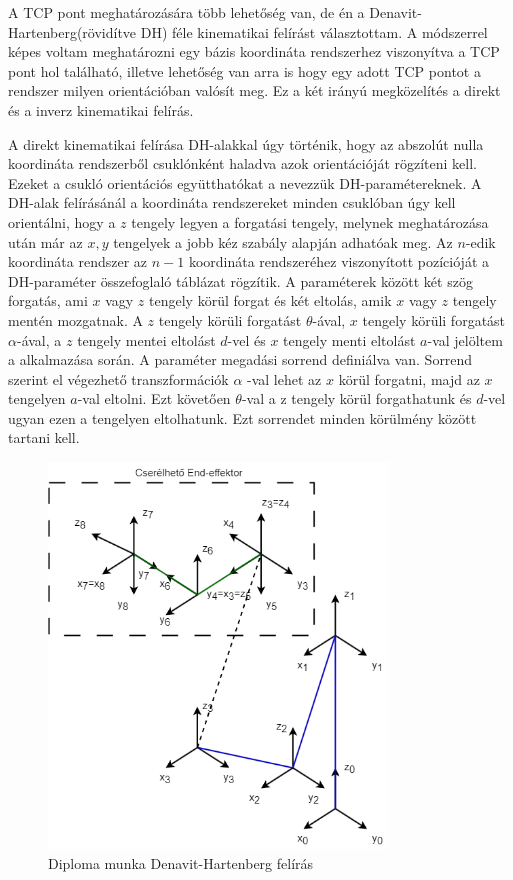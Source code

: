 A TCP pont meghatározására több lehetőség van, de én a Denavit-Hartenberg(rövidítve DH) féle kinematikai felírást választottam. A módszerrel képes voltam meghatározni egy bázis koordináta rendszerhez viszonyítva a TCP pont hol található, illetve lehetőség van arra is hogy egy adott TCP pontot a rendszer milyen orientációban valósít meg. Ez a két irányú megközelítés a direkt és a inverz kinematikai felírás.

A direkt kinematikai felírása DH-alakkal úgy történik, hogy az abszolút nulla koordináta rendszerből csuklónként haladva azok orientációját rögzíteni kell. Ezeket a csukló orientációs együtthatókat a nevezzük DH-paramétereknek. A DH-alak felírásánál a koordináta rendszereket minden csuklóban úgy kell orientálni, hogy a $z$ tengely legyen a forgatási tengely, melynek meghatározása után már az $x,y$ tengelyek a jobb kéz szabály alapján adhatóak meg. Az $n$-edik koordináta rendszer az $n-1$ koordináta rendszeréhez viszonyított pozícióját a DH-paraméter összefoglaló táblázat rögzítik. A paraméterek között két szög forgatás, ami $x$ vagy $z$ tengely körül forgat és két eltolás, amik $x$ vagy $z$ tengely mentén mozgatnak. A $z$ tengely körüli forgatást $\theta$-ával, $x$ tengely körüli forgatást $\alpha$-ával, a $z$ tengely mentei eltolást $d$-vel és $x$ tengely menti eltolást $a$-val jelöltem a alkalmazása során. A paraméter megadási sorrend definiálva van. Sorrend szerint el végezhető transzformációk $\alpha$ -val lehet az $x$ körül forgatni, majd az $x$ tengelyen $a$-val eltolni. Ezt követően $\theta$-val a z tengely körül forgathatunk és $d$-vel ugyan ezen a tengelyen eltolhatunk. Ezt sorrendet minden körülmény között tartani kell.\cite{merat1987introduction}

\begin{figure}[!ht]
\centering
\includegraphics[width=90mm, keepaspectratio]{figures/Diagrammok/DH_feliras}
\caption{Diploma munka Denavit-Hartenberg felírás}
\label{fig:dip_dh}
\end{figure}

